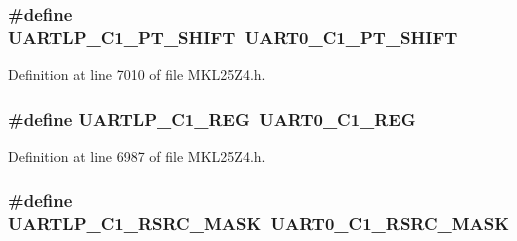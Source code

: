 \subsubsection[{\texorpdfstring{U\+A\+R\+T\+L\+P\+\_\+\+C1\+\_\+\+P\+T\+\_\+\+S\+H\+I\+FT}{UARTLP_C1_PT_SHIFT}}]{\setlength{\rightskip}{0pt plus 5cm}\#define U\+A\+R\+T\+L\+P\+\_\+\+C1\+\_\+\+P\+T\+\_\+\+S\+H\+I\+FT~{\bf U\+A\+R\+T0\+\_\+\+C1\+\_\+\+P\+T\+\_\+\+S\+H\+I\+FT}}\hypertarget{group___backward___compatibility___symbols_ga97ce472c10fd61704932180dc3e26d51}{}\label{group___backward___compatibility___symbols_ga97ce472c10fd61704932180dc3e26d51}


Definition at line 7010 of file M\+K\+L25\+Z4.\+h.

\subsubsection[{\texorpdfstring{U\+A\+R\+T\+L\+P\+\_\+\+C1\+\_\+\+R\+EG}{UARTLP_C1_REG}}]{\setlength{\rightskip}{0pt plus 5cm}\#define U\+A\+R\+T\+L\+P\+\_\+\+C1\+\_\+\+R\+EG~{\bf U\+A\+R\+T0\+\_\+\+C1\+\_\+\+R\+EG}}\hypertarget{group___backward___compatibility___symbols_gac26946834f2a54f1860825b1edc996bb}{}\label{group___backward___compatibility___symbols_gac26946834f2a54f1860825b1edc996bb}


Definition at line 6987 of file M\+K\+L25\+Z4.\+h.

\subsubsection[{\texorpdfstring{U\+A\+R\+T\+L\+P\+\_\+\+C1\+\_\+\+R\+S\+R\+C\+\_\+\+M\+A\+SK}{UARTLP_C1_RSRC_MASK}}]{\setlength{\rightskip}{0pt plus 5cm}\#define U\+A\+R\+T\+L\+P\+\_\+\+C1\+\_\+\+R\+S\+R\+C\+\_\+\+M\+A\+SK~{\bf U\+A\+R\+T0\+\_\+\+C1\+\_\+\+R\+S\+R\+C\+\_\+\+M\+A\+SK}}\hypertarget{group___backward___compatibility___symbols_gaa53951441e58bf423d327892a23aa074}{}\label{group___backward___compatibility___symbols_gaa53951441e58bf423d327892a23aa074}


